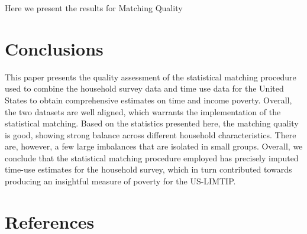 \documentclass[
  11pt,
]{article}
\begin{document}
Here we present the results for Matching Quality

\section{Conclusions}\label{conclusions}

This paper presents the quality assessment of the statistical matching
procedure used to combine the household survey data and time use data
for the United States to obtain comprehensive estimates on time and
income poverty. Overall, the two datasets are well aligned, which
warrants the implementation of the statistical matching. Based on the
statistics presented here, the matching quality is good, showing strong
balance across different household characteristics. There are, however,
a few large imbalances that are isolated in small groups. Overall, we
conclude that the statistical matching procedure employed has precisely
imputed time-use estimates for the household survey, which in turn
contributed towards producing an insightful measure of poverty for the
US-LIMTIP.

\section*{References}\label{references}
\end{document}
